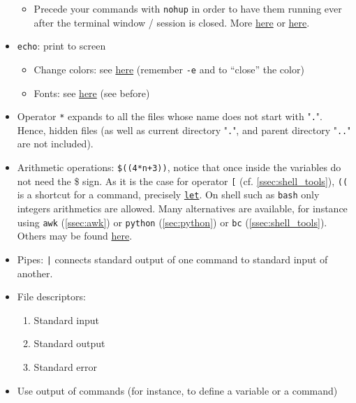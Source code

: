 \documentclass[a4paper,12pt,%
              final%
              ]{article}
\begin{document}
\begin{itemize}
\begin{itemize}
      \item Precede your commands with \texttt{nohup} in order to have them running ever after the terminal window / session is closed. More \href{https://linux.101hacks.com/unix/nohup-command/}{here} or \href{https://hexadix.com/use-nohup-execute-commands-background-keep-running-exit-shell-promt/}{here}.
    \end{itemize}
  \item \texttt{echo}: print to screen
    \begin{itemize}
      \item Change colors: see \href{https://stackoverflow.com/questions/5947742/how-to-change-the-output-color-of-echo-in-linux}{here} (remember \verb|-e| and to ``close'' the color)
      \item Fonts: see \href{https://askubuntu.com/questions/528928/how-to-do-underline-bold-italic-strikethrough-color-background-and-size-i}{here} (see before)
    \end{itemize}
  \item Operator \texttt{*} expands to all the files whose name does not start with "\texttt{.}". Hence, hidden files (as well as current directory "\texttt{.}", and parent directory "\texttt{..}" are not included).
  \item Arithmetic operations: \verb|$((4*n+3))|, notice that once inside the variables do not need the \$ sign. As it is the case for operator \verb|[| (cf. \autoref{ssec:shell_tools}), \verb|((| is a shortcut for a command, precisely \href{https://www.computerhope.com/unix/bash/let.htm}{\texttt{let}}. On shell such as \texttt{bash} only integers arithmetics are allowed. Many alternatives are available, for instance using \texttt{awk} (\autoref{ssec:awk}) or \texttt{python} (\autoref{sec:python}) or \texttt{bc} (\autoref{ssec:shell_tools}). Others may be found \href{https://unix.stackexchange.com/questions/40786/how-to-do-integer-float-calculations-in-bash-or-other-languages-frameworks}{here}.
  \item Pipes: \verb!|! connects standard output of one command to standard input of another.
  \item File descriptors:
    \begin{enumerate}[start=0,label={\texttt{\arabic*} :}]
      \item Standard input
      \item Standard output
      \item Standard error
    \end{enumerate}
  \item Use output of commands (for instance, to define a variable or a command)

\end{itemize}
\end{document}
